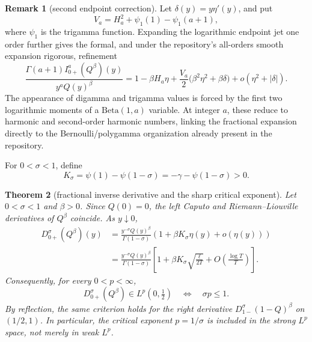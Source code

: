 \documentclass[11pt,oneside]{article}
\newtheorem{theorem}{Theorem}[section]
\theoremstyle{definition}
\newtheorem{remark}[theorem]{Remark}
\newcommand{\Q}{Q}
\begin{document}
\begin{remark}[second endpoint correction]\label{rem:Q-second-correction}
Let \(\delta(y)=y\eta'(y)\), and put
\begin{equation}\label{eq:Va}
 V_a=H_a^2+\psi_1(1)-\psi_1(a+1),
\end{equation}
where \(\psi_1\) is the trigamma function.  Expanding the logarithmic endpoint jet one
order further gives the formal, and under the repository's all-orders smooth expansion
rigorous, refinement
\begin{equation}\label{eq:Q-second-correction}
 \frac{\Gamma(a+1)I_{0+}^{a}(\Q^\beta)(y)}{y^a\Q(y)^\beta}
 =1-\beta H_a\eta
 +\frac{V_a}{2}\bigl(\beta^2\eta^2+\beta\delta\bigr)
 +o(\eta^2+|\delta|).
\end{equation}
The appearance of digamma and trigamma values is forced by the first two logarithmic
moments of a \(\mathrm{Beta}(1,a)\) variable.  At integer \(a\), these reduce to
harmonic and second-order harmonic numbers, linking the fractional expansion directly
to the Bernoulli/polygamma organization already present in the repository.
\end{remark}

For \(0<\sigma<1\), define
\begin{equation}\label{eq:Ksigma}
 K_\sigma=\psi(1)-\psi(1-\sigma)
          =-\gamma-\psi(1-\sigma)>0.
\end{equation}

\begin{theorem}[fractional inverse derivative and the sharp critical exponent]
\label{thm:Q-fractional-derivative-Lp}
Let \(0<\sigma<1\) and \(\beta>0\).  Since \(\Q(0)=0\), the left Caputo and
Riemann--Liouville derivatives of \(\Q^\beta\) coincide.  As \(y\downarrow0\),
\begin{align}
 D_{0+}^{\sigma}(\Q^\beta)(y)
 &=\frac{y^{-\sigma}\Q(y)^\beta}{\Gamma(1-\sigma)}
   \left(1+\beta K_\sigma\eta(y)+o(\eta(y))\right)
 \label{eq:Q-frac-derivative-eta}\\
 &=\frac{y^{-\sigma}\Q(y)^\beta}{\Gamma(1-\sigma)}
   \left[
    1+\beta K_\sigma\sqrt{\frac{\ell}{2T}}
    +O\!\left(\frac{\log T}{T}\right)
   \right].
 \label{eq:Q-frac-derivative-explicit}
\end{align}
Consequently, for every \(0<p<\infty\),
\begin{equation}\label{eq:Q-frac-Lp-threshold}
 D_{0+}^{\sigma}(\Q^\beta)\in L^p(0,\tfrac12)
 \quad\Longleftrightarrow\quad \sigma p\le1.
\end{equation}
By reflection, the same criterion holds for the right derivative
\(D_{1-}^{\sigma}(1-\Q)^\beta\) on \((1/2,1)\).  In particular, the critical
exponent \(p=1/\sigma\) is included in the strong \(L^p\) space, not merely in weak
\(L^p\).
\end{theorem}
\end{document}
